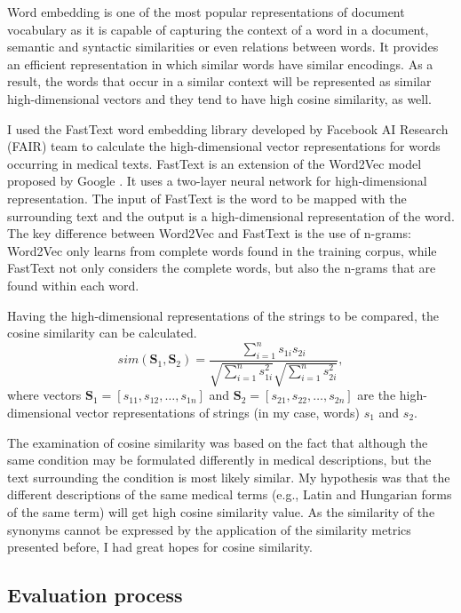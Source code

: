 Word embedding \cite{mikolov2013distributed} is one of the most popular representations of document vocabulary as it is capable of capturing the context of a word in a document, semantic and syntactic similarities or even relations between words. It provides an efficient representation in which similar words have similar encodings. As a result, the words that occur in a similar context will be represented as similar high-dimensional vectors and they tend to have high cosine similarity, as well.

I used the FastText word embedding library developed by Facebook AI Research (FAIR) team to calculate the high-dimensional vector representations for words occurring in medical texts. FastText is an extension of the Word2Vec model proposed by Google \cite{mikolov2013distributed}. It uses a two-layer neural network for high-dimensional representation. The input of FastText is the word to be mapped with the surrounding text and the output is a high-dimensional representation of the word. The key difference between Word2Vec and FastText is the use of n-grams: Word2Vec only learns from complete words found in the training corpus, while FastText not only considers the complete words, but also the n-grams that are found within each word.

Having the high-dimensional representations of the strings to be compared, the cosine similarity can be calculated.
\begin{equation}
	sim(\textbf{S}_1,\textbf{S}_2)=\frac{\sum_{i=1}^{n}s_{1i} s_{2i}}{\sqrt{\sum_{i=1}^{n}s_{1i}^2}\sqrt{\sum_{i=1}^{n}s_{2i}^2}},
	\label{eq:cosine}
\end{equation}
where vectors $\textbf{S}_1=[s_{11},s_{12},\dots,s_{1n}]$ and $\textbf{S}_2=[s_{21},s_{22},\dots,s_{2n}]$ are the high-dimensional vector representations of strings (in my case, words) $s_1$ and $s_2$. 

The examination of cosine similarity was based on the fact that although the same condition may be formulated differently in medical descriptions, but the text surrounding the condition is most likely similar. My hypothesis was that the different descriptions of the same medical terms (e.g., Latin and Hungarian forms of the same term) will get high cosine similarity value. As the similarity of the synonyms cannot be expressed by the application of the similarity metrics presented before, I had great hopes for cosine similarity.

\subsection{Evaluation process}
\label{sec:eval_tm}

